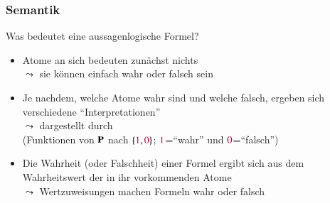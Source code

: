 \documentclass[aspectratio=1610,onlymath]{beamer}
\begin{document}
\begin{frame}\frametitle{Semantik}

\alert{Was bedeutet eine aussagenlogische Formel?}\pause
\begin{itemize}
\item Atome an sich bedeuten zunächst nichts\\
$\leadsto$ sie können einfach wahr oder falsch sein\pause
\item Je nachdem, welche Atome wahr sind und welche falsch, ergeben sich verschiedene "`Interpretationen"'\\
$\leadsto$ dargestellt durch \\
\mbox{}\phantom{$\leadsto$} (Funktionen von $\textbf{\textcolor{black}{P}}$ nach $\{\textcolor{purple}{1},\textcolor{purple}{0}\}$; $\textcolor{purple}{1}$="`wahr"' und $\textcolor{purple}{0}$="`falsch"')\pause
\item Die Wahrheit (oder Falschheit) einer Formel ergibt sich aus dem Wahrheitswert der in ihr vorkommenden Atome\\
$\leadsto$ Wertzuweisungen machen Formeln wahr oder falsch
\end{itemize}


\end{frame}
\end{document}
